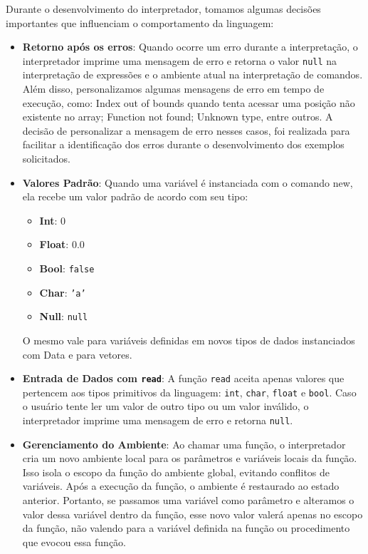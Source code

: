\documentclass{article}
\begin{document}
Durante o desenvolvimento do interpretador, tomamos algumas decisões importantes que influenciam o comportamento da linguagem:

\begin{itemize}
    \item \textbf{Retorno após os erros}: Quando ocorre um erro durante a interpretação, o interpretador imprime uma mensagem de erro e retorna o valor \texttt{null} na interpretação de expressões e o ambiente atual na interpretação de comandos. Além disso, personalizamos algumas mensagens de erro em tempo de execução, como: Index out of bounds quando tenta acessar uma posição não existente no array; Function not found; Unknown type, entre outros. A decisão de personalizar a mensagem de erro nesses casos, foi realizada para facilitar a identificação dos erros durante o desenvolvimento dos exemplos solicitados.
    
    \item \textbf{Valores Padrão}: Quando uma variável é instanciada com o comando new, ela recebe um valor padrão de acordo com seu tipo:
        \begin{itemize}
            \item \textbf{Int}: 0
            \item \textbf{Float}: 0.0
            \item \textbf{Bool}: \texttt{false}
            \item \textbf{Char}: \texttt{'a'}
            \item \textbf{Null}: \texttt{null}
        \end{itemize}
    O mesmo vale para variáveis definidas em novos tipos de dados instanciados com Data e para vetores.
    
    \item \textbf{Entrada de Dados com \texttt{read}}: A função \texttt{read} aceita apenas valores que pertencem aos tipos primitivos da linguagem: \texttt{int}, \texttt{char}, \texttt{float} e \texttt{bool}. Caso o usuário tente ler um valor de outro tipo ou um valor inválido, o interpretador imprime uma mensagem de erro e retorna \texttt{null}.

    \item \textbf{Gerenciamento do Ambiente}: Ao chamar uma função, o interpretador cria um novo ambiente local para os parâmetros e variáveis locais da função. Isso isola o escopo da função do ambiente global, evitando conflitos de variáveis. Após a execução da função, o ambiente é restaurado ao estado anterior. Portanto, se passamos uma variável como parâmetro e alteramos o valor dessa variável dentro da função, esse novo valor valerá apenas no escopo da função, não valendo para a variável definida na função ou procedimento que evocou essa função.
\end{itemize}
\end{document}
